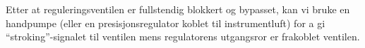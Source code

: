 \vskip 10pt

Etter at reguleringsventilen er fullstendig blokkert og bypasset, kan vi bruke en handpumpe (eller en presisjonsregulator koblet til instrumentluft) for a gi ``stroking''-signalet til ventilen mens regulatorens utgangsror er frakoblet ventilen.




